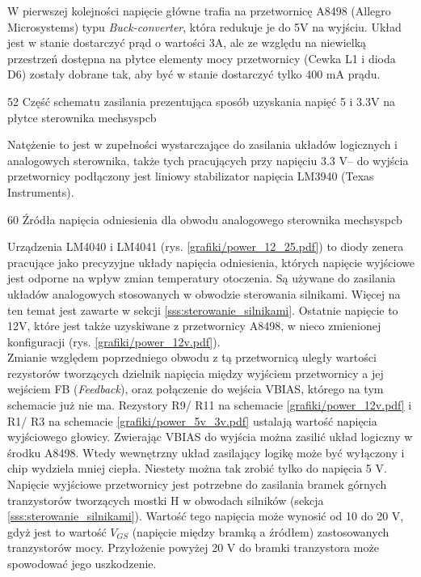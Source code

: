 W pierwszej kolejności napięcie główne trafia na przetwornicę A8498 (Allegro Microsystems) typu {\it Buck-converter}, która redukuje je do 5V na wyjściu. Układ jest w stanie dostarczyć prąd o wartości 3A, ale ze względu na niewielką przestrzeń dostępna na płytce elementy mocy przetwornicy (Cewka L1 i dioda D6) zostały dobrane tak, aby być w stanie dostarczyć tylko 400 mA prądu. 

	{52}
	{Część schematu zasilania prezentująca sposób uzyskania napięć 5 i 3.3V na płytce sterownika}
	{mechsyspcb}

Natężenie to jest w zupełności wystarczające do zasilania układów logicznych i analogowych sterownika, także tych pracujących przy napięciu 3.3 V-- do wyjścia przetwornicy podłączony jest liniowy stabilizator napięcia LM3940 (Texas Instruments).

	{60}
	{Źródła napięcia odniesienia dla obwodu analogowego sterownika}
	{mechsyspcb}
	
Urządzenia LM4040 i LM4041 (rys. \ref{grafiki/power_12_25.pdf}) to diody zenera pracujące jako precyzyjne układy napięcia odniesienia, których napięcie wyjściowe jest odporne na wpływ zmian temperatury otoczenia. Są używane do zasilania układów analogowych stosowanych w obwodzie sterowania silnikami. Więcej na ten temat jest zawarte w sekcji \ref{sss:sterowanie_silnikami}. Ostatnie napięcie to 12V, które jest także uzyskiwane z przetwornicy A8498, w nieco zmienionej konfiguracji (rys. \ref{grafiki/power_12v.pdf}). \\

Zmianie względem poprzedniego obwodu z tą przetwornicą uległy wartości rezystorów tworzących dzielnik napięcia między wyjściem przetwornicy a jej wejściem FB ({\it Feedback}), oraz połączenie do wejścia VBIAS, którego na tym schemacie już nie ma. Rezystory R9/ R11 na schemacie \ref{grafiki/power_12v.pdf} i R1/ R3 na schemacie \ref{grafiki/power_5v_3v.pdf} ustalają wartość napięcia wyjściowego głowicy. Zwierając VBIAS do wyjścia można zasilić układ logiczny w środku A8498. Wtedy wewnętrzny układ zasilający logikę może być wyłączony i chip wydziela mniej ciepła. Niestety można tak zrobić tylko do napięcia 5 V. Napięcie wyjściowe przetwornicy jest potrzebne do zasilania bramek górnych tranzystorów tworzących mostki H w obwodach silników (sekcja \ref{sss:sterowanie_silnikami}). Wartość tego napięcia może wynosić od 10 do 20 V, gdyż jest to wartość $ V_{GS} $ (napięcie między bramką a źródłem) zastosowanych tranzystorów mocy. Przyłożenie powyżej 20 V do bramki tranzystora może spowodować jego uszkodzenie.  

